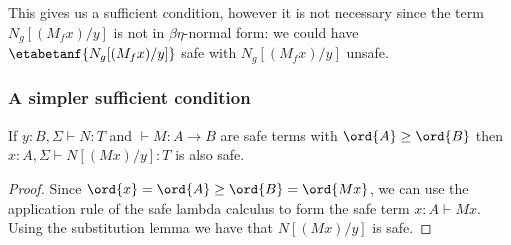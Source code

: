 This gives us a sufficient condition, however it is not necessary since the term $N_g[(M_f x)/y]$ is not in $\beta\eta$-normal form: we could have $\etabetanf{N_g[(M_f x) /y]}$ safe with $N_g[(M_f x) /y]$ unsafe.

\subsubsection{A simpler sufficient condition}
%
%
%
%

\begin{lemma}
If $y:B, \Sigma \vdash N : T$ and $\vdash M : A \rightarrow B$ 
are safe terms with $\ord{A} \geq \ord{B}$
then $x:A, \Sigma \vdash N[(M x)/y] :T$ is also safe.
\end{lemma}
\begin{proof}
Since $\ord{x} = \ord{A} \geq \ord{B} = \ord{M x}$, we can use the application 
rule of the safe lambda calculus to form the safe term $x:A \vdash M x$.
Using the substitution lemma we have that $N[(M x)/y]$ is safe.
\end{proof}

